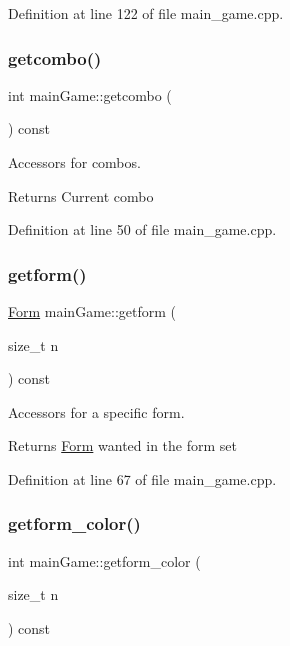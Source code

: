 Definition at line 122 of file main\+\_\+game.\+cpp.

\hypertarget{classmain_game_a6533cd298cbfcf88793f98f6831153fd}{}\label{classmain_game_a6533cd298cbfcf88793f98f6831153fd} 
\subsubsection{\texorpdfstring{getcombo()}{getcombo()}}
{\footnotesize\ttfamily int main\+Game\+::getcombo (\begin{DoxyParamCaption}{ }\end{DoxyParamCaption}) const}



Accessors for combos. 

\begin{DoxyReturn}{Returns}
Current combo 
\end{DoxyReturn}


Definition at line 50 of file main\+\_\+game.\+cpp.

\hypertarget{classmain_game_a961f1b96d73ad87965008691c7a653a7}{}\label{classmain_game_a961f1b96d73ad87965008691c7a653a7} 
\subsubsection{\texorpdfstring{getform()}{getform()}}
{\footnotesize\ttfamily \hyperlink{class_form}{Form} main\+Game\+::getform (\begin{DoxyParamCaption}\item[{size\+\_\+t}]{n }\end{DoxyParamCaption}) const}



Accessors for a specific form. 

\begin{DoxyReturn}{Returns}
\hyperlink{class_form}{Form} wanted in the form set 
\end{DoxyReturn}


Definition at line 67 of file main\+\_\+game.\+cpp.

\hypertarget{classmain_game_a195bf2338d8e96d0be3add1b24ccbef5}{}\label{classmain_game_a195bf2338d8e96d0be3add1b24ccbef5} 
\subsubsection{\texorpdfstring{getform\+\_\+color()}{getform\_color()}}
{\footnotesize\ttfamily int main\+Game\+::getform\+\_\+color (\begin{DoxyParamCaption}\item[{size\+\_\+t}]{n }\end{DoxyParamCaption}) const}



